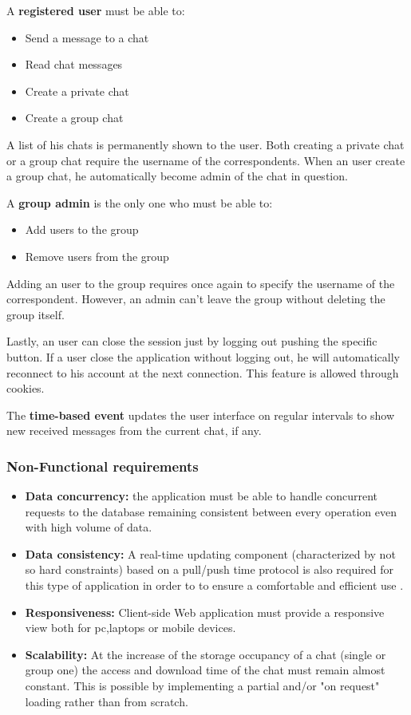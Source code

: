 \documentclass[10pt]{article}
\begin{document}
A \textbf{registered user} must be able to:
\begin{itemize}
    \item Send a message to a chat
    \item Read chat messages
    \item Create a private chat
    \item Create a group chat
\end{itemize}

A list of his chats is permanently shown to the user. Both creating a private chat or a 
group chat require the username of the correspondents.
When an user create a group chat, he automatically become admin of the chat in question.

A \textbf{group admin} is the only one who must be able to:
\begin{itemize}
    \item Add users to the group
    \item Remove users from the group
\end{itemize}

Adding an user to the group requires once again to specify the username of the 
correspondent. However, an admin can't leave the group without deleting the group itself.

Lastly, an user can close the session just by logging out pushing the specific button. If a user 
close the application without logging out, he will automatically reconnect to his account at 
the next connection. This feature is allowed through cookies.

The \textbf{time-based event} updates the user interface on regular intervals
to show new received messages from the current chat, if any.

\subsubsection{Non-Functional requirements}
\begin{itemize}
	\item \textbf{Data concurrency:} the application must be able to handle concurrent requests to the database remaining consistent between every operation even with high volume of data. 
	
	\item \textbf{Data consistency:} A real-time updating component (characterized by not so hard constraints)  based on a pull/push time protocol is also required for this type of application in order to to ensure a comfortable and efficient use .
	
	\item \textbf{Responsiveness:} Client-side Web application must provide a responsive view both for pc,laptops or mobile devices.
	
	\item \textbf{Scalability:} At the increase of the storage occupancy of a chat (single or group one) the access and download time of the chat must remain almost constant. This is possible by implementing a partial and/or "on request" loading rather than from scratch.
	
	 
\end{itemize}
\end{document}
